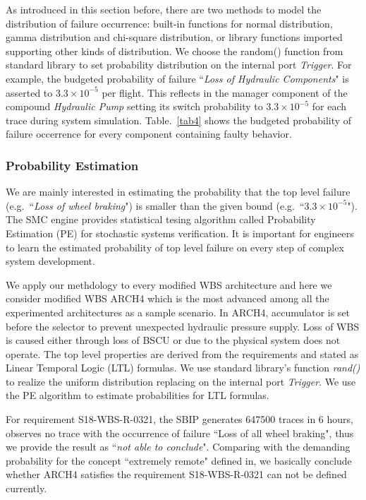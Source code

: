 As introduced in this section before, there are two methods to model the distribution of failure occurrence: built-in functions for normal distribution, gamma distribution and chi-square distribution, or library functions imported supporting other kinds of distribution. We choose the random() function from standard library to set probability distribution on the internal port \emph{Trigger}. For example, the budgeted probability of failure ``\emph{Loss of Hydraulic Components}" is asserted to $3.3\times10^{-5}$ per flight. This reflects in the manager component of the compound \emph{Hydraulic Pump} setting its switch probability to $3.3\times10^{-5}$ for each trace during system simulation. Table.~\ref{tab4} shows the budgeted probability of failure occerrence for every component containing faulty behavior.

\subsubsection{Probability Estimation}
We are mainly interested in estimating the probability that the top level failure (e.g.\ ``\emph{Loss of wheel braking}") is smaller than the given bound (e.g.\ ``$3.3\times10^{-5}$"). The SMC engine provides statistical tesing algorithm called Probability Estimation (PE)\cite{vmcai04} for stochastic systems verification. It is important for engineers to learn the estimated probability of top level failure on every step of complex system development.

We apply our methdology to every modified WBS architecture and here we consider modified WBS ARCH4 which is the most advanced among all the experimented architectures as a sample scenario.
In ARCH4, accumulator is set before the selector to prevent unexpected hydraulic pressure supply. Loss of WBS is caused either through loss of BSCU or due to the physical system does not operate. The top level properties are derived from the requirements and stated as Linear Temporal Logic (LTL) formulas. We use standard library's function \emph{rand()} to realize the uniform distribution\cite{uniform} replacing on the internal port \emph{Trigger}. We use the PE algorithm to estimate probabilities for LTL formulas. 

For requirement S18-WBS-R-0321, the SBIP generates 647500 traces in 6 hours, observes no trace with the occurrence of failure ``Loss of all wheel braking", thus we provide the result as ``\emph{not able to conclude}". Comparing with the demanding probability for the concept ``extremely remote" defined in\cite{ac}, we basically conclude whether ARCH4 satisfies the requirement S18-WBS-R-0321 can not be defined currently.


